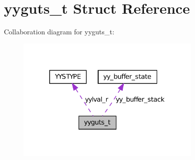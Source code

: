 \hypertarget{structyyguts__t}{
\section{yyguts\_\-t Struct Reference}
\label{structyyguts__t}
}


Collaboration diagram for yyguts\_\-t:
\nopagebreak
\begin{figure}[H]
\begin{center}
\leavevmode
\includegraphics[width=256pt]{structyyguts__t__coll__graph}
\end{center}
\end{figure}
